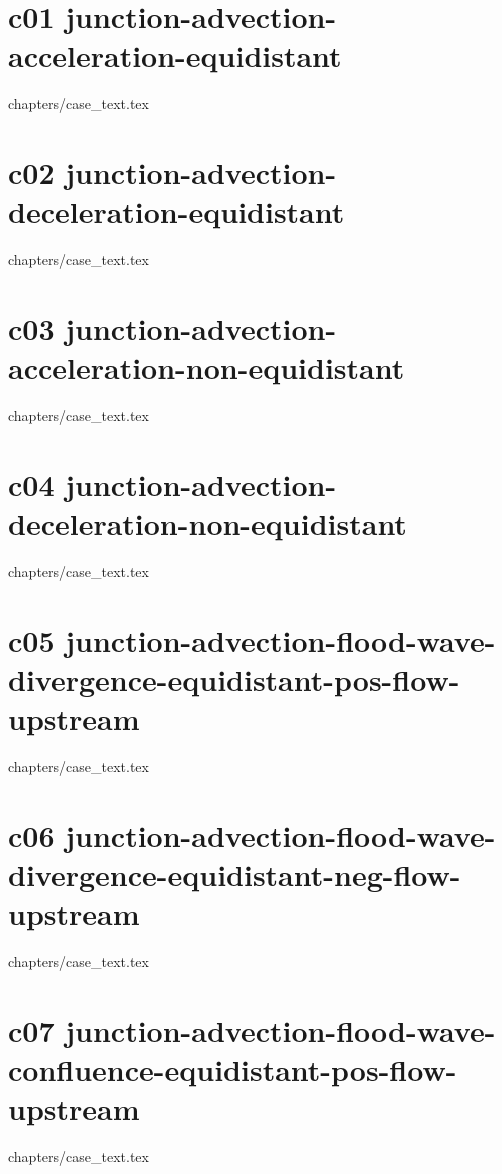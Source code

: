 %
%
\chapter{c01 junction-advection-acceleration-equidistant}
\graphicspath{{../c01_junction-advection-acceleration-equidistant/doc/}}
{chapters/case_text.tex}
%
\chapter{c02 junction-advection-deceleration-equidistant}
\graphicspath{{../c02_junction-advection-deceleration-equidistant/doc/}}
{chapters/case_text.tex}
%
\chapter{c03 junction-advection-acceleration-non-equidistant}
\graphicspath{{../c03_junction-advection-acceleration-non-equidistant/doc/}}
{chapters/case_text.tex}
%
\chapter{c04 junction-advection-deceleration-non-equidistant}
\graphicspath{{../c04_junction-advection-deceleration-non-equidistant/doc/}}
{chapters/case_text.tex}
%
\chapter{c05 junction-advection-flood-wave-divergence-equidistant-pos-flow-upstream}
\graphicspath{{../c05_junction-advection-flood-wave-divergence-equidistant-pos-flow-upstream/doc/}}
{chapters/case_text.tex}
%
\chapter{c06 junction-advection-flood-wave-divergence-equidistant-neg-flow-upstream}
\graphicspath{{../c06_junction-advection-flood-wave-divergence-equidistant-neg-flow-upstream/doc/}}
{chapters/case_text.tex}
%
\chapter{c07 junction-advection-flood-wave-confluence-equidistant-pos-flow-upstream}
\graphicspath{{../c07_junction-advection-flood-wave-confluence-equidistant-pos-flow-upstream/doc/}}
{chapters/case_text.tex}
%
